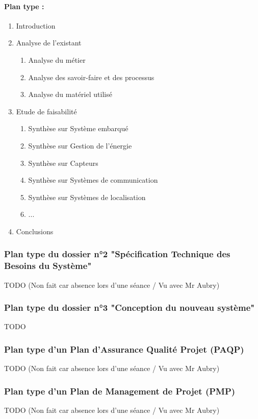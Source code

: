       \paragraph*{Plan type :\\}
        \begin{enumerate}
          \item Introduction
          \item Analyse de l'existant
            \begin{enumerate}
              \item Analyse du métier
              \item Analyse des savoir-faire et des processus
              \item Analyse du matériel utilisé
            \end{enumerate}
          \item Etude de faisabilité
            \begin{enumerate}
              \item Synthèse sur Système embarqué
              \item Synthèse sur Gestion de l'énergie
              \item Synthèse sur Capteurs
              \item Synthèse sur Systèmes de communication
              \item Synthèse sur Systèmes de localisation
              \item ...
            \end{enumerate} 
          \item Conclusions 
        \end{enumerate}
        
    \subsubsection{Plan type du dossier n°2 "Spécification Technique des Besoins du Système"}
    TODO (Non fait car absence lors d'une séance / Vu avec Mr Aubry)
    \subsubsection{Plan type du dossier n°3 "Conception du nouveau système"}
    TODO
    \subsubsection{Plan type d'un Plan d'Assurance Qualité Projet (PAQP)}
    TODO (Non fait car absence lors d'une séance / Vu avec Mr Aubry)
    \subsubsection{Plan type d'un Plan de Management de Projet (PMP)}
    TODO (Non fait car absence lors d'une séance / Vu avec Mr Aubry)